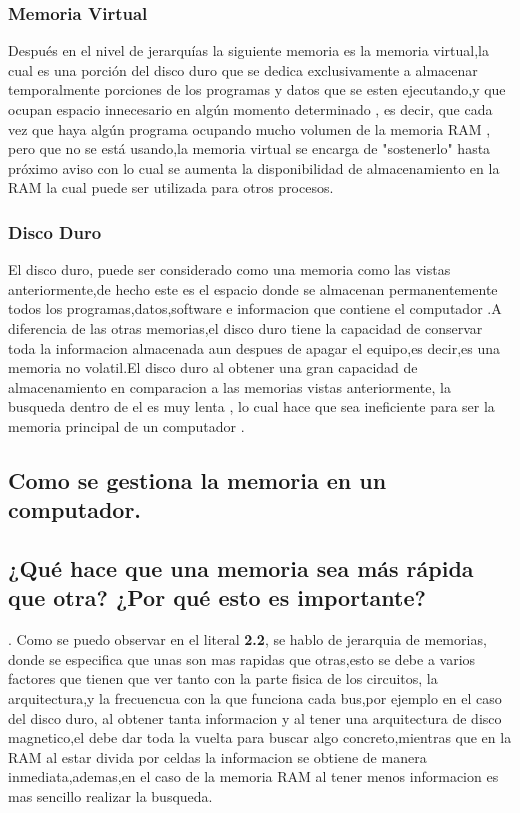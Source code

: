 \documentclass{article}
\begin{document}
\subsubsection{Memoria Virtual}
Después en el nivel de jerarquías la siguiente memoria es la memoria virtual,la cual es una porción del disco duro que se dedica exclusivamente a almacenar temporalmente porciones de los programas y datos que se esten ejecutando,y que ocupan espacio innecesario en algún momento determinado , es decir, que cada vez que haya algún programa ocupando mucho volumen de la memoria RAM , pero que no se está usando,la memoria virtual se encarga de "sostenerlo" hasta próximo aviso con lo cual se aumenta la disponibilidad de almacenamiento en la RAM la cual puede ser utilizada para otros procesos\cite{augusto}.

\subsubsection{Disco Duro}
El disco duro, puede ser considerado como una memoria como las vistas anteriormente,de hecho este es el espacio donde se almacenan permanentemente todos los programas,datos,software e informacion que contiene el computador .A diferencia de las otras memorias,el disco duro tiene la capacidad de conservar toda la informacion almacenada aun despues de apagar el equipo,es decir,es una memoria no volatil.El disco duro al obtener una gran capacidad de almacenamiento en comparacion a las memorias vistas anteriormente, la busqueda dentro de el es muy lenta , lo cual hace que sea ineficiente para ser la memoria principal de un computador \cite{disco}.

\subsection{Como se gestiona la memoria en un computador.} \label{contenido}

\subsection{¿Qué hace que una memoria sea más rápida que otra? ¿Por qué esto es importante?}.\label{comparacion}
Como se puedo observar en el literal \textbf{2.2}, se hablo de jerarquia de memorias, donde se especifica que unas son mas rapidas que otras,esto se debe a varios factores que tienen que ver  tanto con la parte fisica de los circuitos, la  arquitectura,y la frecuencua con la que funciona cada bus,por ejemplo en el caso del disco duro, al obtener tanta informacion y al tener una arquitectura de disco magnetico,el debe dar toda la vuelta para buscar algo concreto,mientras que en la RAM al estar divida por celdas la informacion se obtiene de manera inmediata,ademas,en el caso de la memoria RAM al tener menos informacion es mas sencillo realizar la busqueda.\\\
\end{document}
